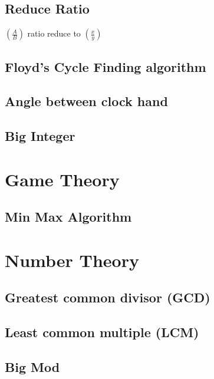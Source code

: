 \documentclass[11pt]{report}
\begin{document}
\section{Reduce Ratio}
$\left(\frac{A}{B}\right)$ ratio reduce to $\left(\frac{x}{y}\right)$

\section{Floyd's Cycle Finding algorithm}

\section{Angle between clock hand}

\section{Big Integer}



\chapter{Game Theory}
\section{Min Max Algorithm}


\chapter{Number Theory}
\section{Greatest common divisor (GCD)}

\section{Least common multiple (LCM)}

\section{Big Mod}
\end{document}
